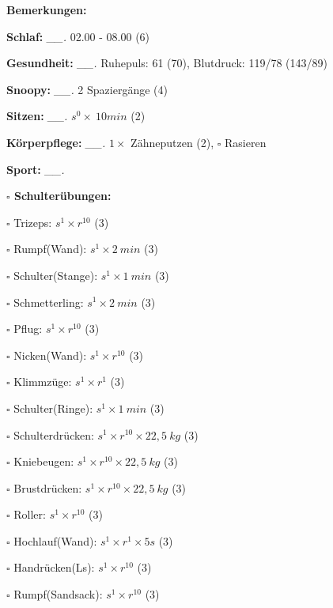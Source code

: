 \documentclass[10pt,a4paper]{article}
\newcommand\prop[1] {{\color {alizarin} {\bf #1}}}             %
\newcommand\mand[1] {{\color {burntorange} {\bf #1}}}          %
\newcommand\topspace{\vskip -15pt \hskip 20pt}
\newcommand\n[1] { {\sl #1.} \hskip 5pt }
\begin{document}
\begin{mdframed}[style=daystyle]
  \begin{labeling}{{\mand {Bemerkungen:}}}
    \setlength\itemsep{-3pt}
  \item[{\mand {Schlaf:}}]        \n{\_\_} 02.00 - 08.00 (6)
  \item[{\mand {Gesundheit:}}]    \n{\_\_} Ruhepuls: 61 (70), Blutdruck: 119/78 (143/89)
  \item[{\mand {Snoopy:}}]        \n{\_\_} 2 Spaziergänge (4)
  \item[{\mand {Sitzen:}}]        \n{\_\_} $s^0 \times\ 10 min$ (2)
  \item[{\mand {Körperpflege:}}]  \n{\_\_} $1 \times$ Zähneputzen (2), $\square$ Rasieren
  \item[{\mand {Sport:}}]         \n{\_\_}
    \topspace
    \begin{minipage}{0.75\textwidth}  
      \begin{labeling}{\prop {$\square$ {Schulterübungen:}}} 
        \setlength\itemsep{-3pt}
      \item[$\square$ Trizeps:]          $s^1 \times r^{10}$ (3)
      \item[$\square$ Rumpf(Wand):]      $s^1 \times 2\ min$ (3)
      \item[$\square$ Schulter(Stange):] $s^1 \times 1\ min$ (3)
      \item[$\square$ Schmetterling:]    $s^1 \times 2\ min$ (3)
      \item[$\square$ Pflug:]            $s^1 \times r^{10}$ (3)
      \item[$\square$ Nicken(Wand):]     $s^1 \times r^{10}$ (3)
      \item[$\square$ Klimmzüge:]        $s^1 \times r^1$ (3)
      \item[$\square$ Schulter(Ringe):]  $s^1 \times 1\ min$ (3)
      \item[$\square$ Schulterdrücken:]  $s^1 \times r^{10} \times 22,5\ kg$ (3)
      \item[$\square$ Kniebeugen:]       $s^1 \times r^{10} \times 22,5\ kg$ (3)
      \item[$\square$ Brustdrücken:]     $s^1 \times r^{10} \times 22,5\ kg$ (3)
      \item[$\square$ Roller:]           $s^1 \times r^{10}$ (3)
      \item[$\square$ Hochlauf(Wand):]   $s^1 \times r^{1} \times 5s$ (3)
      \item[$\square$ Handrücken(Ls):]   $s^1 \times r^{10}$ (3)
      \item[$\square$ Rumpf(Sandsack):]  $s^1 \times r^{10}$ (3)

\end{labeling}
\end{minipage}
\end{labeling}
\end{mdframed}
\end{document}
